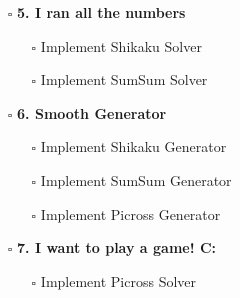 \documentclass{article}
\begin{document}
	\begin{minipage}[t]{0.45\textwidth}
		\strut\vspace*{-\baselineskip}\newline
		\begin{itemize}
			\item[$\square$] \textbf{5. I ran all the numbers}
			\begin{itemize}
				\item[$\square$] Implement Shikaku Solver
				\item[$\square$] Implement SumSum Solver
			\end{itemize}
			\item[$\square$] \textbf{6. Smooth Generator}
			\begin{itemize}
				\item[$\square$] Implement Shikaku Generator
				\item[$\square$] Implement SumSum Generator
				\item[$\square$] Implement Picross Generator
			\end{itemize}
			\item[$\square$] \textbf{7. I want to play a game! C:}
			\begin{itemize}
				\item[$\square$] Implement Picross Solver
			\end{itemize}
		\end{itemize}
	\end{minipage}
		
\end{document}
